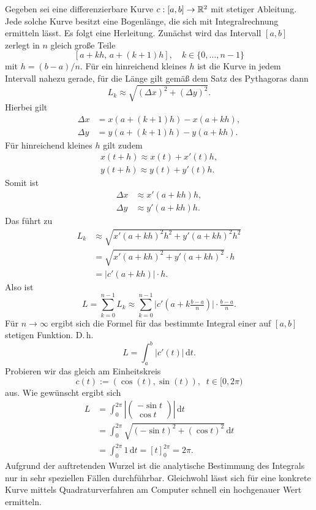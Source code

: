 Gegeben sei eine differenzierbare Kurve $c: [a,b]\to\mathbb R^2$ mit
stetiger Ableitung. Jede solche Kurve besitzt eine Bogenlänge, die sich
mit Integralrechnung ermitteln lässt. Es folgt eine Herleitung.
Zunächst wird das Intervall $[a,b]$ zerlegt in $n$ gleich große Teile
\[[a+kh,\,a+(k{+}1)h],\quad k\in\{0,\ldots,n-1\}\]
mit $h=(b-a)/n$. Für ein hinreichend kleines $h$ ist die Kurve in
jedem Intervall nahezu gerade, für die Länge gilt gemäß dem Satz des
Pythagoras dann
\begin{equation}
L_k \approx \sqrt{(\Delta x)^2+(\Delta y)^2}.
\end{equation}
Hierbei gilt
\begin{align*}
\Delta x &= x(a+(k{+}1)h)-x(a+kh),\\
\Delta y &= y(a+(k{+}1)h)-y(a+kh).
\end{align*}
Für hinreichend kleines $h$ gilt zudem
\begin{align*}
x(t+h) \approx x(t)+x'(t)h,\\
y(t+h) \approx y(t)+y'(t)h.
\end{align*}
Somit ist
\begin{align*}
\Delta x &\approx x'(a+kh)h,\\
\Delta y &\approx y'(a+kh)h.
\end{align*}
Das führt zu
\begin{align*}
L_k &\approx \sqrt{x'(a+kh)^2 h^2+y'(a+kh)^2 h^2}\\
&= \sqrt{x'(a+kh)^2+y'(a+kh)^2}\cdot h\\
&= |c'(a+kh)|\cdot h.
\end{align*}
Also ist
\begin{equation}
L = \sum_{k=0}^{n-1} L_k
\approx \sum_{k=0}^{n-1} \big|c'(a+k\tfrac{b-a}{n})\big|\cdot\tfrac{b-a}{n}.
\end{equation}
Für $n\to\infty$ ergibt sich die Formel für das bestimmte
Integral einer auf $[a,b]$ stetigen Funktion. D.\,h.%
\begin{equation}
L = \int_a^b |c'(t)|\,\mathrm dt.
\end{equation}
Probieren wir das gleich am Einheitskreis
\[c(t):=(\cos(t),\sin(t)),\;\;t\in{[0,2\pi)}\]
aus. Wie gewünscht ergibt sich
\begin{align*}
L &= \int_0^{2\pi} \left|\begin{pmatrix}-\sin t\\ \cos t\end{pmatrix}\right|\,\mathrm dt\\
&= \int_0^{2\pi} \sqrt{(-\sin t)^2+(\cos t)^2}\,\mathrm dt\\
&= \int_0^{2\pi} 1\,\mathrm dt = [t]_{0}^{2\pi} = 2\pi.
\end{align*}
Aufgrund der auftretenden Wurzel ist die analytische Bestimmung
des Integrals nur in sehr speziellen Fällen durchführbar.
Gleichwohl lässt sich für eine konkrete Kurve mittels
Quadraturverfahren am Computer schnell ein hochgenauer Wert ermitteln.

